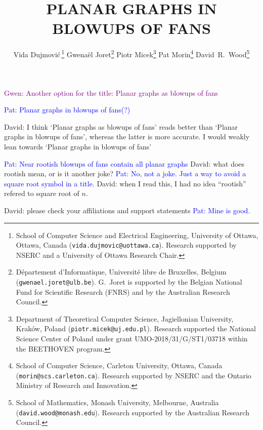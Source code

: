 \documentclass{patmorin}
\title{\MakeUppercase{\boldmath Planar graphs in blowups of fans}}
\author{
 Vida Dujmovi{\'c}\,\footnote{School of Computer Science and Electrical Engineering, University of Ottawa, Ottawa, Canada (\texttt{vida.dujmovic@uottawa.ca}). Research supported by NSERC and a University of Ottawa Research Chair.}
 \qquad
 Gwena\"el Joret\footnote{D\'epartement d'Informatique, Universit\'e libre de Bruxelles, Belgium ({\tt gwenael.joret@ulb.be}). G.\ Joret is supported by the Belgian National Fund for Scientific Research (FNRS) and by the Australian Research Council.}
 \qquad
 Piotr Micek\footnote{Department of Theoretical Computer Science, Jagiellonian University, Kraków, Poland (\texttt{piotr.micek@uj.edu.pl}). Research supported
 the National Science Center of Poland under grant UMO-2018/31/G/ST1/03718 within the BEETHOVEN program.}
 \qquad
 Pat Morin\footnote{School of Computer Science, Carleton University, Ottawa, Canada (\texttt{morin@scs.carleton.ca}). Research supported by NSERC and the Ontario Ministry of Research and Innovation.}
 \qquad
 David~R.~Wood\footnote{School of Mathematics, Monash University, Melbourne, Australia (\texttt{david.wood@monash.edu}). Research supported by the Australian Research Council.}
 }
\date{}
\newcommand{\david}[1]{{\color{orange} David: #1}}
\newcommand{\pat}[1]{\textcolor{Blue}{Pat: #1}}
\newcommand{\gwen}[1]{\textcolor{Purple}{Gwen: #1}}
\begin{document}
\maketitle

\gwen{Another option for the title: Planar graphs as blowups of fans}

\pat{Planar graphs in blowups of fans(?)} 

\david{I think `Planar graphs as blowups of fans' reads better than `Planar graphs in blowups of fans', whereas the latter is more accurate. I would weakly lean towards `Planar graphs in blowups of fans'}

\pat{Near rootish blowups of fans contain all planar graphs}
\david{what does rootish mean, or is it another joke?} \pat{No, not a joke.  Just a way to avoid a square root symbol in a title.} \david{when I read this, I had no idea ``rootish'' refered to square root of $n$.}

\david{please check your affiliations and support statements} \pat{Mine is good.}
\end{document}

